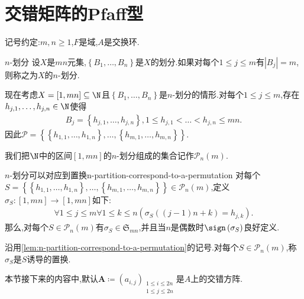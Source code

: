 \section{交错矩阵的Pfaff型}

记号约定:$m,n\geq 1$,$F$是域,$A$是交换环.

\begin{definition}{$n$-划分}{}
	设$X$是$mn$元集,$\left\{B_{1},\ldots,B_{n}\right\}$是$X$的划分.如果对每个$1\leq j\leq m$有$\left|B_{j}\right|=m$,则称之为$X$的$n$-划分.
\end{definition}

\begin{remark}{}{}
	现在考虑$X=\left[1,mn\right]\subseteq\N$且$\left\{B_{1},\ldots,B_{n}\right\}$是$n$-划分的情形.对每个$1\leq j\leq m$,存在$h_{j,1},\ldots,h_{j,n}\in \N$使得
	\begin{align*}
		B_{j}=\left\{h_{j,1},\ldots,h_{j,n}\right\},1\leq h_{j,1}<\ldots<h_{j,n}\leq mn.
	\end{align*}
	因此$\mathcal{P}=\left\{\left\{h_{1,1},\ldots,h_{1,n}\right\},\ldots,\left\{h_{m,1},\ldots,h_{m,n}\right\}\right\}$.
\end{remark}

\begin{definition}{}{}
	我们把$\N$中的区间$\left[1,mn\right]$的$n$-划分组成的集合记作$\mathcal{P}_{n}\left(m\right)$.
\end{definition}

\begin{lemma}{$n$-划分可以对应到置换}{n-partition-correspond-to-a-permutation}
	对每个$S=\left\{\left\{h_{1,1},\ldots,h_{1,n}\right\},\ldots,\left\{h_{m,1},\ldots,h_{m,n}\right\}\right\}\in\mathcal{P}_{n}\left(m\right)$,定义$\sigma_{S}:\left[1,mn\right]\to\left[1,mn\right]$如下:
	\begin{align*}
		\forall 1\leq j\leq m\forall 1\leq k\leq n\left(\sigma_{S}\left(\left(j-1\right)n+k\right)=h_{j,k}\right).
	\end{align*}
	那么,对每个$S\in\mathcal{P}_{n}\left(m\right)$有$\sigma_{S}\in\mathfrak{S}_{mn}$,并且当$n$是偶数时$\sign\left(\sigma_{S}\right)$良好定义.
\end{lemma}

\begin{definition}{}{}
	沿用\cref{lem:n-partition-correspond-to-a-permutation}的记号.对每个$S\in\mathcal{P}_{n}\left(m\right)$,称$\sigma_{S}$是$S$诱导的置换.
\end{definition}

本节接下来的内容中,默认$\boldsymbol{A}\coloneq\left(a_{i,j}\right)_{\substack{1\leq i\leq 2n\\1\leq j\leq 2n}}$是$A$上的交错方阵.

